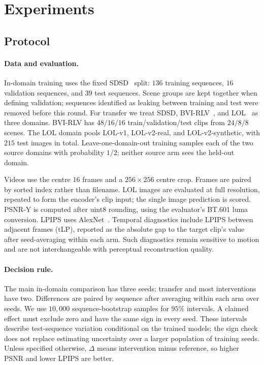 \section{Experiments}\label{sec:exp}

\subsection{Protocol}\label{sec:exp:protocol}

\paragraph{Data and evaluation.}
In-domain training uses the fixed SDSD~\citep{sdsd} split:
$136$ training sequences, $16$ validation sequences, and $39$ test sequences.
Scene groups are kept together when defining validation; sequences identified
as leaking between training and test were removed before this round.
For transfer we treat SDSD, BVI-RLV~\citep{bvi_rlv}, and
LOL~\citep{lol_v1,lol_v2} as three domains.
BVI-RLV has $48/16/16$ train/validation/test clips from $24/8/8$ scenes.
The LOL domain pools LOL-v1, LOL-v2-real, and LOL-v2-synthetic, with
$215$ test images in total.
Leave-one-domain-out training samples each of the two source domains with
probability $1/2$; neither source arm sees the held-out domain.

Videos use the centre $16$ frames and a $256\times256$ centre crop.
Frames are paired by sorted index rather than filename.
LOL images are evaluated at full resolution, repeated to form the encoder's
clip input; the single image prediction is scored.
PSNR-Y is computed after uint8 rounding, using the evaluator's BT.601 luma
conversion. LPIPS uses AlexNet~\citep{lpips}.
Temporal diagnostics include LPIPS between adjacent frames (tLP), reported
as the absolute gap to the target clip's value after seed-averaging within
each arm. Such diagnostics remain sensitive to
motion and are not interchangeable with perceptual reconstruction quality.

\paragraph{Decision rule.}
The main in-domain comparison has three seeds; transfer and most interventions
have two. Differences are paired by sequence after averaging within each arm
over seeds. We use $10{,}000$ sequence-bootstrap samples for $95\%$ intervals.
A claimed effect must exclude zero and have the same sign in every seed.
These intervals describe test-sequence variation conditional on the trained
models; the sign check does not replace estimating uncertainty over a larger
population of training seeds.
Unless specified otherwise, $\Delta$ means intervention minus reference,
so higher PSNR and lower LPIPS are better.

